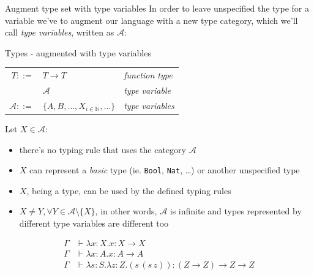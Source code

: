 \documentclass[8pt]{beamer}
\begin{document}
\begin{frame}{Augment type set with type variables}
    In order to leave unspecified the type for a variable we've to augment
    our language with a new type category, which we'll call \emph{type
    variables}, written as $\mathcal{A}$:
    \begin{block}{Types - augmented with type variables}
        \begin{center}
            \begin{tabular}{ r l l }
              $T ::= $ & $T \rightarrow T$ & \emph{function type} \\
               & $\mathcal{A}$ & \emph{type variable} \\
              $\mathcal{A} ::= $ & $\{A,B,\ldots,X_{i \in \mathbb{N}},
                \ldots \}$ & \emph{type variables} \\
            \end{tabular}
        \end{center}
    \end{block}
    \pause
    Let $X \in \mathcal{A}$:
    \begin{itemize}
        \item there's no typing rule that uses the category $\mathcal{A}$
        \item $X$ can represent a \emph{basic} type
            (ie. \texttt{Bool}, \texttt{Nat}, \ldots) or another 
            unspecified type
        \item $X$, being a type, can be used by the defined typing rules
        \item $X \not = Y, \forall Y \in \mathcal{A} \setminus \{X\}$, 
            in other words, $\mathcal{A}$ is infinite and types represented
            by different type variables are different too
    \end{itemize}
    \pause
    \begin{example}
        \begin{displaymath}
            \begin{split}
                \Gamma &\vdash \lambda x:X.x : X \rightarrow X\\
                \Gamma &\vdash \lambda x:A.x : A \rightarrow A\\
                \Gamma &\vdash \lambda s:S. \lambda z: Z. (s\, (s\, z)) : 
                    (Z \rightarrow Z) \rightarrow Z \rightarrow Z\\
            \end{split}
        \end{displaymath}
    \end{example}
\end{frame}
\end{document}
